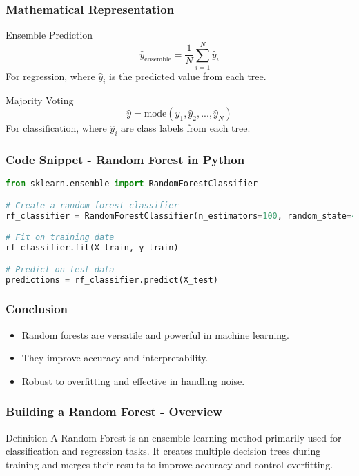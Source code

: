 \documentclass[aspectratio=169]{beamer}
\begin{document}
\begin{frame}
    \frametitle{Mathematical Representation}
    \begin{block}{Ensemble Prediction}
        \begin{equation}
        \hat{y}_{\text{ensemble}} = \frac{1}{N} \sum_{i=1}^{N} \hat{y}_i 
        \end{equation}
        \footnotesize{For regression, where \( \hat{y}_i \) is the predicted value from each tree.}
    \end{block}
    \begin{block}{Majority Voting}
        \begin{equation}
        \hat{y} = \text{mode}(\hat{y}_1, \hat{y}_2, ..., \hat{y}_N) 
        \end{equation}
        \footnotesize{For classification, where \( \hat{y}_i \) are class labels from each tree.}
    \end{block}
\end{frame}

\begin{frame}[fragile]
    \frametitle{Code Snippet - Random Forest in Python}
    \begin{lstlisting}[language=Python]
from sklearn.ensemble import RandomForestClassifier

# Create a random forest classifier
rf_classifier = RandomForestClassifier(n_estimators=100, random_state=42)

# Fit on training data
rf_classifier.fit(X_train, y_train)

# Predict on test data
predictions = rf_classifier.predict(X_test)
    \end{lstlisting}
\end{frame}

\begin{frame}
    \frametitle{Conclusion}
    \begin{itemize}
        \item Random forests are versatile and powerful in machine learning.
        \item They improve accuracy and interpretability.
        \item Robust to overfitting and effective in handling noise.
    \end{itemize}
\end{frame}

\begin{frame}[fragile]
    \frametitle{Building a Random Forest - Overview}
    \begin{block}{Definition}
        A Random Forest is an ensemble learning method primarily used for classification and regression tasks. It creates multiple decision trees during training and merges their results to improve accuracy and control overfitting.
    \end{block}
\end{frame}
\end{document}
